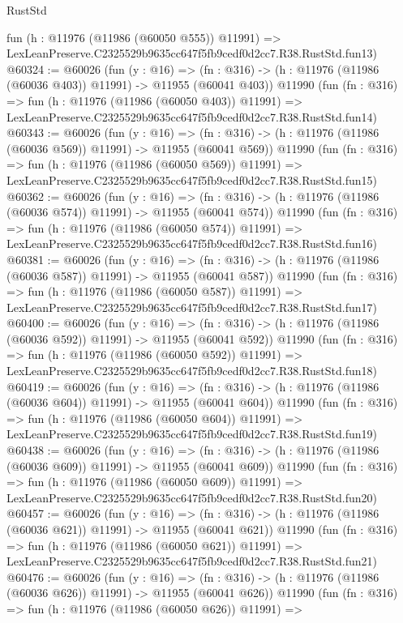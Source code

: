 \begin{lexlean}{RustStd}
\begin{coremodule}
    fun (h : @11976 (@11986 (@60050 @555)) @11991) =>
    LexLeanPreserve.C2325529b9635cc647f5fb9cedf0d2cc7.R38.RustStd.fun13)
@60324 := @60026
    (fun (y : @16) =>
    (fn : @316) -> (h : @11976 (@11986 (@60036 @403)) @11991) -> @11955 (@60041 @403))
    @11990
    (fun (fn : @316) =>
    fun (h : @11976 (@11986 (@60050 @403)) @11991) =>
    LexLeanPreserve.C2325529b9635cc647f5fb9cedf0d2cc7.R38.RustStd.fun14)
@60343 := @60026
    (fun (y : @16) =>
    (fn : @316) -> (h : @11976 (@11986 (@60036 @569)) @11991) -> @11955 (@60041 @569))
    @11990
    (fun (fn : @316) =>
    fun (h : @11976 (@11986 (@60050 @569)) @11991) =>
    LexLeanPreserve.C2325529b9635cc647f5fb9cedf0d2cc7.R38.RustStd.fun15)
@60362 := @60026
    (fun (y : @16) =>
    (fn : @316) -> (h : @11976 (@11986 (@60036 @574)) @11991) -> @11955 (@60041 @574))
    @11990
    (fun (fn : @316) =>
    fun (h : @11976 (@11986 (@60050 @574)) @11991) =>
    LexLeanPreserve.C2325529b9635cc647f5fb9cedf0d2cc7.R38.RustStd.fun16)
@60381 := @60026
    (fun (y : @16) =>
    (fn : @316) -> (h : @11976 (@11986 (@60036 @587)) @11991) -> @11955 (@60041 @587))
    @11990
    (fun (fn : @316) =>
    fun (h : @11976 (@11986 (@60050 @587)) @11991) =>
    LexLeanPreserve.C2325529b9635cc647f5fb9cedf0d2cc7.R38.RustStd.fun17)
@60400 := @60026
    (fun (y : @16) =>
    (fn : @316) -> (h : @11976 (@11986 (@60036 @592)) @11991) -> @11955 (@60041 @592))
    @11990
    (fun (fn : @316) =>
    fun (h : @11976 (@11986 (@60050 @592)) @11991) =>
    LexLeanPreserve.C2325529b9635cc647f5fb9cedf0d2cc7.R38.RustStd.fun18)
@60419 := @60026
    (fun (y : @16) =>
    (fn : @316) -> (h : @11976 (@11986 (@60036 @604)) @11991) -> @11955 (@60041 @604))
    @11990
    (fun (fn : @316) =>
    fun (h : @11976 (@11986 (@60050 @604)) @11991) =>
    LexLeanPreserve.C2325529b9635cc647f5fb9cedf0d2cc7.R38.RustStd.fun19)
@60438 := @60026
    (fun (y : @16) =>
    (fn : @316) -> (h : @11976 (@11986 (@60036 @609)) @11991) -> @11955 (@60041 @609))
    @11990
    (fun (fn : @316) =>
    fun (h : @11976 (@11986 (@60050 @609)) @11991) =>
    LexLeanPreserve.C2325529b9635cc647f5fb9cedf0d2cc7.R38.RustStd.fun20)
@60457 := @60026
    (fun (y : @16) =>
    (fn : @316) -> (h : @11976 (@11986 (@60036 @621)) @11991) -> @11955 (@60041 @621))
    @11990
    (fun (fn : @316) =>
    fun (h : @11976 (@11986 (@60050 @621)) @11991) =>
    LexLeanPreserve.C2325529b9635cc647f5fb9cedf0d2cc7.R38.RustStd.fun21)
@60476 := @60026
    (fun (y : @16) =>
    (fn : @316) -> (h : @11976 (@11986 (@60036 @626)) @11991) -> @11955 (@60041 @626))
    @11990
    (fun (fn : @316) =>
    fun (h : @11976 (@11986 (@60050 @626)) @11991) =>

\end{coremodule}
\end{lexlean}

